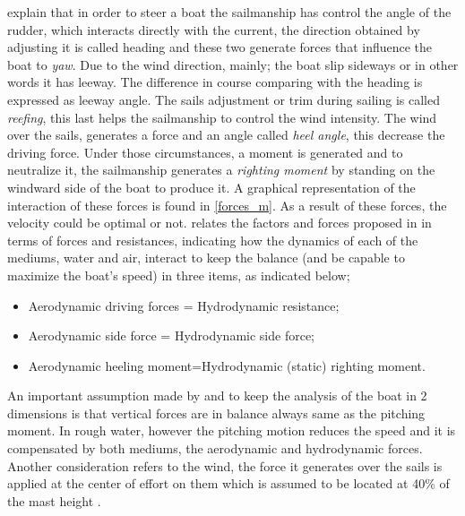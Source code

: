 \cite{philpott1993yacht}  explain that in order to steer a boat the sailmanship has control the angle of the rudder, which interacts directly with the current, the direction obtained by adjusting it is called heading and these two generate forces that influence the boat to \textit{yaw}. Due to the wind direction, mainly; the boat slip sideways or in other words it has leeway. The difference in course comparing with the heading is expressed as leeway angle. The sails adjustment or trim during sailing is called \textit{reefing}, this last helps the sailmanship to control the wind intensity.  The wind over the sails, generates a force and an angle called \textit{heel angle}, this decrease the driving force. Under those circumstances, a moment is generated and to neutralize it, the sailmanship generates a \textit{righting moment} by standing on the windward side of the boat to produce it. A graphical representation of the interaction of these forces is  found in \ref{forces_m}.  As a result of these forces, the velocity could be optimal or not. \cite{larsonprinciples} relates the factors and forces proposed in\cite{philpott1993yacht} in terms of forces and resistances, indicating how the dynamics of each of the mediums, water and air,  interact to keep the balance (and be capable to maximize the boat's speed)  in three items, as indicated below; 
\begin{itemize}  \label{milgramforces}
 \setlength \itemsep{0em}
\item Aerodynamic driving forces = Hydrodynamic resistance;
\item Aerodynamic side force = Hydrodynamic side force;
\item Aerodynamic heeling moment=Hydrodynamic (static) righting moment.
\end{itemize}


An important assumption made by  \cite{philpott1993yacht} and \cite{larsonprinciples} to keep the analysis of the boat in 2 dimensions is that vertical forces are in balance always same as the pitching moment. In rough water, however the pitching motion reduces the speed and it is compensated by both mediums, the aerodynamic and hydrodynamic forces. Another consideration refers to the wind, the force it generates over the sails is applied at  the center of effort on them which is assumed to be located at 40\% of the mast height \cite{philpott1993yacht}. \par

